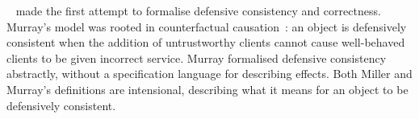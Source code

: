 {%


~\cite{Murray10dphil} made the first attempt to formalise defensive consistency and
correctness.  Murray's model was rooted in
counterfactual causation~\cite{Lewis_73}: an object is defensively
consistent when the addition of untrustworthy clients cannot cause
well-behaved clients to be given incorrect service.  Murray formalised
defensive consistency %
abstractly, 
without a specification language for describing effects.
Both Miller and
Murray's definitions are intensional, describing what it means for an
object to be defensively consistent.



}

